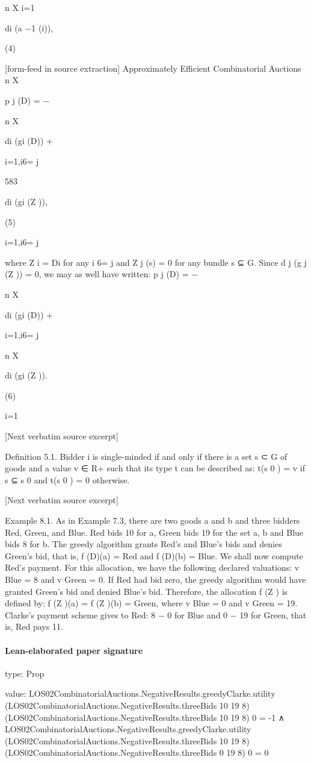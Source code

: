 \documentclass[10pt]{article}
\begin{document}
\begin{ReviewVerbatim}
n
X
i=1

di (a −1 (i)),

(4)


[form-feed in source extraction]
Approximately Efficient Combinatorial Auctions
n
X

p j (D) = −

n
X

di (gi (D)) +

i=1,i6= j

583

di (gi (Z )),

(5)

i=1,i6= j

where Z i = Di for any i 6= j and Z j (s) = 0 for any bundle s ⊆ G. Since
d j (g j (Z )) = 0, we may as well have written:
p j (D) = −

n
X

di (gi (D)) +

i=1,i6= j

n
X

di (gi (Z )).

(6)

i=1

[Next verbatim source excerpt]

Definition 5.1. Bidder i is single-minded if and only if there is a set s ⊂ G of
goods and a value v ∈ R+ such that its type t can be described as: t(s 0 ) = v if s ⊆ s 0
and t(s 0 ) = 0 otherwise.

[Next verbatim source excerpt]

Example 8.1. As in Example 7.3, there are two goods a and b and three bidders
Red, Green, and Blue. Red bids 10 for a, Green bids 19 for the set {a, b} and Blue
bids 8 for b. The greedy algorithm grants Red’s and Blue’s bids and denies Green’s
bid, that is, f (D)(a) = Red and f (D)(b) = Blue. We shall now compute Red’s
payment. For this allocation, we have the following declared valuations: v Blue = 8
and v Green = 0. If Red had bid zero, the greedy algorithm would have granted
Green’s bid and denied Blue’s bid. Therefore, the allocation f (Z ) is defined by:
f (Z )(a) = f (Z )(b) = Green, where v Blue = 0 and v Green = 19. Clarke’s payment
scheme gives to Red: 8 − 0 for Blue and 0 − 19 for Green, that is, Red pays 11.
\end{ReviewVerbatim}



\paragraph{Lean-elaborated paper signature}
\begin{ReviewVerbatim}
type:
Prop

value:
LOS02CombinatorialAuctions.NegativeResults.greedyClarke.utility
      (LOS02CombinatorialAuctions.NegativeResults.threeBids 10 19 8)
      (LOS02CombinatorialAuctions.NegativeResults.threeBids 10 19 8) 0 =
    -1 ∧
  LOS02CombinatorialAuctions.NegativeResults.greedyClarke.utility
      (LOS02CombinatorialAuctions.NegativeResults.threeBids 10 19 8)
      (LOS02CombinatorialAuctions.NegativeResults.threeBids 0 19 8) 0 =
    0
\end{ReviewVerbatim}
\end{document}
